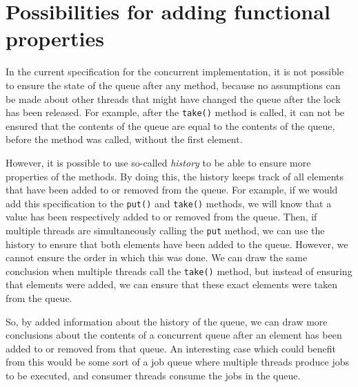 \section{Possibilities for adding functional properties}
In the current specification for the concurrent implementation, it is not possible to ensure the state of the queue after any method, because no assumptions can be made about other threads that might have changed the queue after the lock has been released. For example, after the {\tt take()} method is called, it can not be ensured that the contents of the queue are equal to the contents of the queue, before the method was called, without the first element.

However, it is possible to use so-called {\it history} to be able to ensure more properties of the methods. By doing this, the history keeps track of all elements that have been added to or removed from the queue. For example, if we would add this specification to the {\tt put()} and {\tt take()} methods, we will know that a value has been respectively added to or removed from the queue. Then, if multiple threads are simultaneously calling the {\tt put} method, we can use the history to ensure that both elements have been added to the queue. However, we cannot ensure the order in which this was done. We can draw the same conclusion when multiple threads call the {\tt take()} method, but instead of ensuring that elements were added, we can ensure that these exact elements were taken from the queue.

So, by added information about the history of the queue, we can draw more conclusions about the contents of a concurrent queue after an element has been added to or removed from that queue. An interesting case which could benefit from this would be some sort of a job queue where multiple threads produce jobs to be executed, and consumer threads consume the jobs in the queue.
